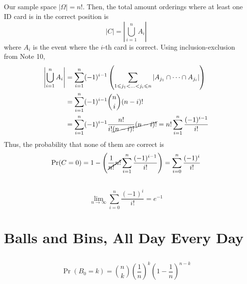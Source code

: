 \documentclass{article}
\begin{document}
\subsection{}

Our sample space \(|\Omega| = n!\).
Then, the total amount orderings where at least one ID card is in the correct position is
\begin{equation}
    |C| = \left|\bigcup_{i = 1}^n A_i\right|
\end{equation}
where \(A_i\) is the event where the \(i\)-th card is correct.
Using inclusion-exclusion from Note 10,
\begin{align}
    \left|\bigcup_{i = 1}^n A_i\right| &= \sum_{i = 1}^n (-1)^{i - 1} \left(\sum_{1 \leqslant j_1 < \ldots < j_i \leqslant n} |A_{j_1} \cap \cdots \cap A_{j_i}|\right) \\
    &= \sum_{i = 1}^n (-1)^{i - 1} \binom{n}{i} (n - i)! \\
    &= \sum_{i = 1}^n (-1)^{i - 1} \frac{n!}{i! \cancel{(n - i)!}} \cancel{(n - i)!} = n! \sum_{i = 1}^n \frac{(-1)^{i - 1}}{i!}
\end{align}
Thus, the probability that none of them are correct is
\begin{equation}
    \Pr(C = 0) = 1 - \left(\frac{1}{\cancel{n!}} \cancel{n!} \sum_{i = 1}^n \frac{(-1)^{i - 1}}{i!}\right) = \sum_{i = 0}^n \frac{(-1)^i}{i!}
\end{equation}

\subsection{}

\begin{equation}
    \lim_{n \to \infty} \sum_{i = 0}^n \frac{(-1)^i}{i!} = e^{-1}
\end{equation}

\section{Balls and Bins, All Day Every Day}

\subsection{}

\begin{equation}
    \Pr(B_0 = k) = \binom{n}{k} \left(\frac{1}{n}\right)^k \left(1 - \frac{1}{n}\right)^{n - k}
\end{equation}
\end{document}

